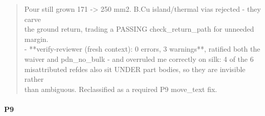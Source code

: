 \documentclass[11pt,a4paper]{article}
\begin{document}
\begin{quote}
  Pour still grown 171 -\textgreater{} 250 mm2. B.Cu island/thermal vias rejected - they carve\\
  the ground return, trading a PASSING check\_return\_path for unneeded margin.\\
- {*}{*}verify-reviewer (fresh context): 0 errors, 3 warnings{*}{*}, ratified both the\\
  waiver and pdn\_no\_bulk - and overruled me correctly on silk: 4 of the 6\\
  misattributed refdes also sit UNDER part bodies, so they are invisible rather\\
  than ambiguous. Reclassified as a required P9 move\_text fix.
\end{quote}
\paragraph*{P9}
\end{document}
